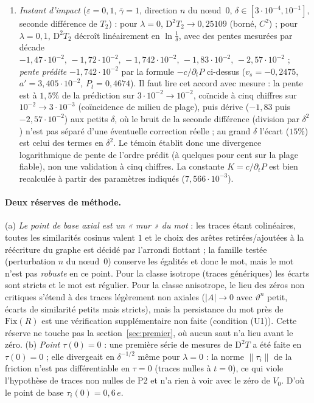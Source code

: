 \documentclass[11pt,a4paper]{article}
\theoremstyle{remark}
\newcommand{\vth}{\vartheta}
\newcommand{\D}{\mathrm D}
\begin{document}
\begin{enumerate}[nosep]
\item \emph{Instant d'impact} ($\varepsilon=0{,}1$, $\bar\gamma=1$, direction $n$ du nœud~0, $\delta\in[3\cdot10^{-4},10^{-1}]$, seconde différence de $T_2$) : pour $\lambda=0$, $\D^2T_2\to0{,}25109$ (borné, $C^2$) ; pour $\lambda=0{,}1$, $\D^2T_2$ décroît linéairement en $\ln\frac1\delta$, avec des pentes mesurées par décade $-1{,}47\cdot10^{-2},\,-1{,}72\cdot10^{-2},\,-1{,}742\cdot10^{-2},\,-1{,}83\cdot10^{-2},\,-2{,}57\cdot10^{-2}$ ; \emph{pente prédite} $-1{,}742\cdot10^{-2}$ par la formule $-c/\partial_tP$ ci-dessus ($v_s=-0{,}2475$, $a'=3{,}405\cdot10^{-2}$, $P_t=0{,}4674$). Il faut lire cet accord avec mesure : la pente est à $1{,}5\%$ de la prédiction sur $3\cdot10^{-2}\to10^{-2}$, coïncide à cinq chiffres sur $10^{-2}\to3\cdot10^{-3}$ (coïncidence de milieu de plage), puis dérive ($-1{,}83$ puis $-2{,}57\cdot10^{-2}$) aux petits $\delta$, où le bruit de la seconde différence (division par $\delta^2$) n'est pas séparé d'une éventuelle correction réelle ; au grand $\delta$ l'écart ($15\%$) est celui des termes en $\delta^2$. Le témoin établit donc une divergence logarithmique de pente de l'ordre prédit (à quelques pour cent sur la plage fiable), non une validation à cinq chiffres. La constante $K=c/\partial_tP$ est bien recalculée à partir des paramètres indiqués ($7{,}566\cdot10^{-3}$).
\end{enumerate}
\paragraph{Deux réserves de méthode.} (a) \emph{Le point de base axial est un « mur » du mot} : les traces étant colinéaires, toutes les similarités cosinus valent $1$ et le choix des arêtes retirées/ajoutées à la réécriture du graphe est décidé par l'arrondi flottant ; la famille testée (perturbation $n$ du nœud~0) conserve les égalités et donc le mot, mais le mot n'est pas \emph{robuste} en ce point. Pour la classe isotrope (traces génériques) les écarts sont stricts et le mot est régulier. Pour la classe anisotrope, le lieu des zéros non critiques s'étend à des traces légèrement non axiales ($\lvert A\rvert\to0$ avec $\vth^n$ petit, écarts de similarité petits mais stricts), mais la persistance du mot près de $\mathrm{Fix}(R)$ est une vérification supplémentaire non faite (condition (U1)). Cette réserve ne touche pas la section~\ref{sec:premier}, où aucun saut n'a lieu avant le zéro. (b) \emph{Point $\tau(0)=0$} : une première série de mesures de $\D^2T$ a été faite en $\tau(0)=0$ ; elle divergeait en $\delta^{-1/2}$ même pour $\lambda=0$ : la norme $\lVert\tau_i\rVert$ de la friction n'est pas différentiable en $\tau=0$ (traces nulles à $t=0$), ce qui viole l'hypothèse de traces non nulles de P2 et n'a rien à voir avec le zéro de $V_0$. D'où le point de base $\tau_i(0)=0{,}6\,e$.
\end{document}
